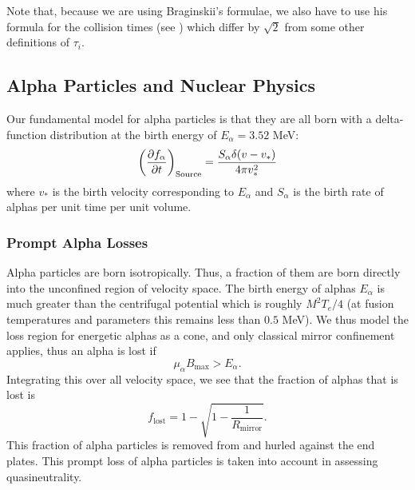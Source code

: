 \documentclass{revtex4-2}
\begin{document}
Note that, because we are using Braginskii's formulae, we also have to use his formula for the collision times (see \citet{braginskii1965tpp}) which differ by $\sqrt{2}$ from some other definitions of $\tau_i$.

\subsection{Alpha Particles and Nuclear Physics}
Our fundamental model for alpha particles is that they are all born with a delta-function distribution at the birth energy of $E_\alpha = 3.52$ MeV:
\begin{equation}
\left(  \frac{\partial f_\alpha} {\partial t} \right)_{\mathrm{Source}} = \frac{S_\alpha \delta(v-v_*)}{4\pi v_*^2}
\end{equation}
where $v_*$ is the birth velocity corresponding to $E_\alpha$ and $S_\alpha$ is the birth rate of alphas per unit time per unit volume.

\subsubsection{Prompt Alpha Losses}
Alpha particles are born isotropically. Thus, a fraction of them are born directly into the unconfined region of velocity space.
The birth energy of alphas $E_\alpha$ is much greater than the centrifugal potential which is roughly $M^2 T_e / 4$ (at fusion temperatures and parameters this remains
less than $0.5$ MeV). We thus model the loss region for energetic alphas as a cone, and only classical mirror confinement applies, thus an alpha is lost if
\begin{equation}
\mu_\alpha B_{\mathrm{max}} > E_\alpha.
\end{equation}
Integrating this over all velocity space, we see that the fraction of alphas that is lost is
\begin{equation}
f_{\mathrm{lost}} = 1 - \sqrt{1 - \frac{1}{R_{\mathrm{mirror}}}}.
\end{equation}
This fraction of alpha particles is removed from \mctrans{} and hurled against the end plates.
This prompt loss of alpha particles is taken into account in assessing quasineutrality.
\end{document}
